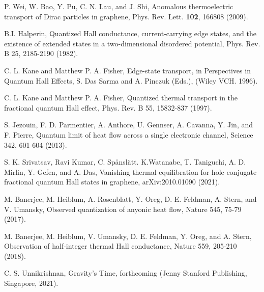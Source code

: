 \documentclass[aps,preprint,12pt,tightenlines]{revtex4}%
\begin{document}
\begin{thebibliography}{99}
P. Wei, W. Bao, Y. Pu, C. N. Lau, and J. Shi, Anomalous
thermoelectric transport of Dirac particles in graphene, Phys. Rev. Lett.
\textbf{102}, 166808 (2009).

B.I. Halperin, Quantized Hall conductance,
current-carrying edge states, and the existence of extended states in a
two-dimensional disordered potential, Phys. Rev. B 25, 2185-2190 (1982).

C. L. Kane and Matthew P. A. Fisher, Edge-state transport,
in Perspectives in Quantum Hall Effects, S. Das Sarma and A. Pinczuk (Eds.),
(Wiley VCH. 1996).

C. L. Kane and Matthew P. A. Fisher, Quantized thermal
transport in the fractional quantum Hall effect, Phys. Rev. B 55, 15832-837 (1997).

S. Jezouin, F. D. Parmentier, A. Anthore, U. Gennser, A.
Cavanna, Y. Jin, and F. Pierre, Quantum limit of heat flow across a single
electronic channel, Science 342, 601-604 (2013).

S. K. Srivatsav, Ravi Kumar, C. Sp\aa nsl\"{a}tt.
K.Watanabe, T. Taniguchi, A. D. Mirlin, Y. Gefen, and A. Das, Vanishing
thermal equilibration for hole-conjugate fractional quantum Hall states in
graphene, arXiv:2010.01090 (2021).

M. Banerjee, M. Heiblum, A. Rosenblatt, Y. Oreg, D. E.
Feldman, A. Stern, and V. Umansky, Observed quantization of anyonic heat flow,
Nature 545, 75-79 (2017).

M. Banerjee, M. Heiblum, V. Umansky, D. E. Feldman, Y.
Oreg, and A. Stern, Observation of half-integer thermal Hall conductance,
Nature 559, 205-210 (2018).

C. S. Unnikrishnan, Gravity's Time, forthcoming (Jenny
Stanford Publishing, Singapore, 2021).
\end{thebibliography}
\end{document}
